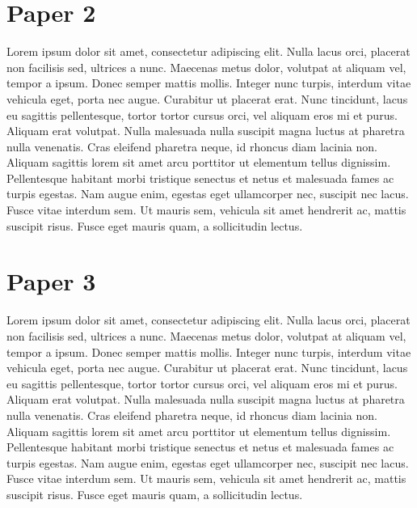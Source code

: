 \documentclass[12pt,a4paper,titlepage]{report}
\begin{document}
\section{Paper 2}
Lorem ipsum dolor sit amet, consectetur adipiscing elit. Nulla lacus orci, placerat non facilisis sed, ultrices a nunc. Maecenas metus dolor, volutpat at aliquam vel, tempor a ipsum. Donec semper mattis mollis. Integer nunc turpis, interdum vitae vehicula eget, porta nec augue. Curabitur ut placerat erat. Nunc tincidunt, lacus eu sagittis pellentesque, tortor tortor cursus orci, vel aliquam eros mi et purus. Aliquam erat volutpat. Nulla malesuada nulla suscipit magna luctus at pharetra nulla venenatis. Cras eleifend pharetra neque, id rhoncus diam lacinia non. Aliquam sagittis lorem sit amet arcu porttitor ut elementum tellus dignissim. Pellentesque habitant morbi tristique senectus et netus et malesuada fames ac turpis egestas. Nam augue enim, egestas eget ullamcorper nec, suscipit nec lacus. Fusce vitae interdum sem. Ut mauris sem, vehicula sit amet hendrerit ac, mattis suscipit risus. Fusce eget mauris quam, a sollicitudin lectus.
\section{Paper 3}
Lorem ipsum dolor sit amet, consectetur adipiscing elit. Nulla lacus orci, placerat non facilisis sed, ultrices a nunc. Maecenas metus dolor, volutpat at aliquam vel, tempor a ipsum. Donec semper mattis mollis. Integer nunc turpis, interdum vitae vehicula eget, porta nec augue. Curabitur ut placerat erat. Nunc tincidunt, lacus eu sagittis pellentesque, tortor tortor cursus orci, vel aliquam eros mi et purus. Aliquam erat volutpat. Nulla malesuada nulla suscipit magna luctus at pharetra nulla venenatis. Cras eleifend pharetra neque, id rhoncus diam lacinia non. Aliquam sagittis lorem sit amet arcu porttitor ut elementum tellus dignissim. Pellentesque habitant morbi tristique senectus et netus et malesuada fames ac turpis egestas. Nam augue enim, egestas eget ullamcorper nec, suscipit nec lacus. Fusce vitae interdum sem. Ut mauris sem, vehicula sit amet hendrerit ac, mattis suscipit risus. Fusce eget mauris quam, a sollicitudin lectus.
\end{document}
